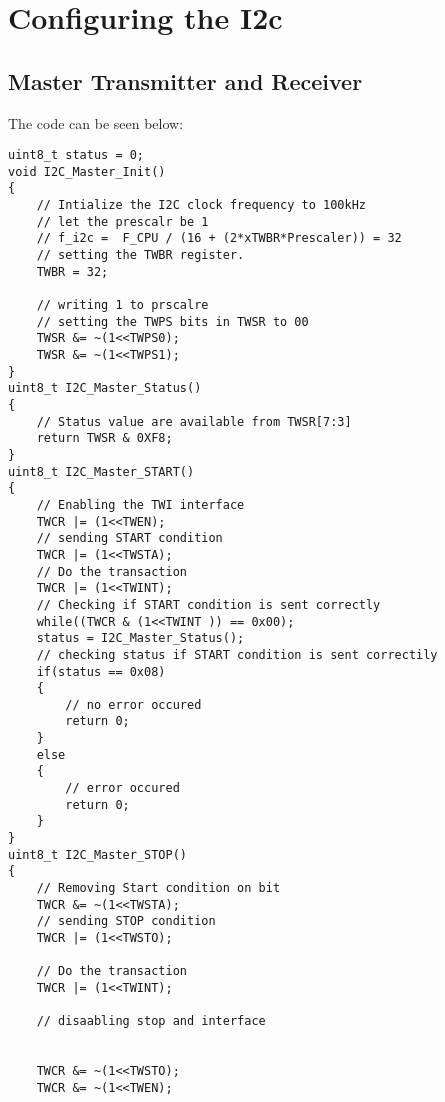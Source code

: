 \section{Configuring the I2c}
\subsection{Master Transmitter and Receiver}

\quad The code can be seen below:

\begin{verbatim}
uint8_t status = 0;
void I2C_Master_Init()
{
	// Intialize the I2C clock frequency to 100kHz
	// let the prescalr be 1
	// f_i2c =  F_CPU / (16 + (2*xTWBR*Prescaler)) = 32
	// setting the TWBR register.
	TWBR = 32;

	// writing 1 to prscalre
	// setting the TWPS bits in TWSR to 00
	TWSR &= ~(1<<TWPS0);
	TWSR &= ~(1<<TWPS1);
}
uint8_t I2C_Master_Status()
{
	// Status value are available from TWSR[7:3]
	return TWSR & 0XF8;
}
uint8_t I2C_Master_START()
{
	// Enabling the TWI interface
	TWCR |= (1<<TWEN);
	// sending START condition
	TWCR |= (1<<TWSTA);
	// Do the transaction
	TWCR |= (1<<TWINT);
	// Checking if START condition is sent correctly
	while((TWCR & (1<<TWINT )) == 0x00);
	status = I2C_Master_Status();
	// checking status if START condition is sent correctily
	if(status == 0x08)
	{
		// no error occured
		return 0;
	}
	else
	{
		// error occured
		return 0;
	}
}
uint8_t I2C_Master_STOP()
{
	// Removing Start condition on bit
	TWCR &= ~(1<<TWSTA);
	// sending STOP condition
	TWCR |= (1<<TWSTO);
	
	// Do the transaction
	TWCR |= (1<<TWINT);

	// disaabling stop and interface
	
	
	TWCR &= ~(1<<TWSTO);
	TWCR &= ~(1<<TWEN);


\end{verbatim}
